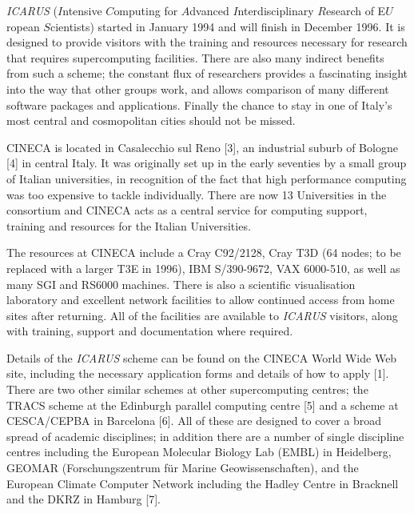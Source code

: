 {{\it ICARUS} ($I$ntensive $C$omputing for $A$dvanced $I$nterdisciplinary
$R$esearch of E$U$ropean $S$cientists) started in January 1994 and
will finish in December 1996.  It is designed to provide visitors with
the training and resources necessary for research that requires
supercomputing facilities.  There are also many indirect benefits from
such a scheme; the constant flux of researchers provides a fascinating
insight into the way that other groups work, and allows comparison of
many different software packages and applications.  Finally the chance
to stay in one of Italy's most central and cosmopolitan cities should
not be missed.

CINECA is located in Casalecchio sul Reno [3], an industrial suburb of
Bologne [4] in central Italy.  It was originally set up in the early
seventies by a small group of Italian universities, in recognition of
the fact that high performance computing was too expensive to tackle
individually.  There are now 13 Universities in the consortium and
CINECA acts as a central service for computing support, training and
resources for the Italian Universities.

The resources at CINECA include a Cray C92/2128, Cray T3D (64 nodes;
to be replaced with a larger T3E in 1996), IBM S/390-9672, VAX
6000-510, as well as many SGI and RS6000 machines.  There is also a
scientific visualisation laboratory and excellent network facilities
to allow continued access from home sites after returning.  All of the
facilities are available to {\it ICARUS} visitors, along with
training, support and documentation where required.

Details of the {\it ICARUS} scheme can be found on the CINECA World
Wide Web site, including the necessary application forms and details
of how to apply [1].  There are two other similar schemes at other
supercomputing centres; the TRACS scheme at the Edinburgh parallel
computing centre [5] and a scheme at CESCA/CEPBA in Barcelona [6]. All
of these are designed to cover a broad spread of academic disciplines;
in addition there are a number of single discipline centres including
the European Molecular Biology Lab (EMBL) in Heidelberg, GEOMAR
(Forschungszentrum f\"ur Marine Geowissenschaften), and the European
Climate Computer Network including the Hadley Centre in Bracknell
and the DKRZ in Hamburg [7].

}
